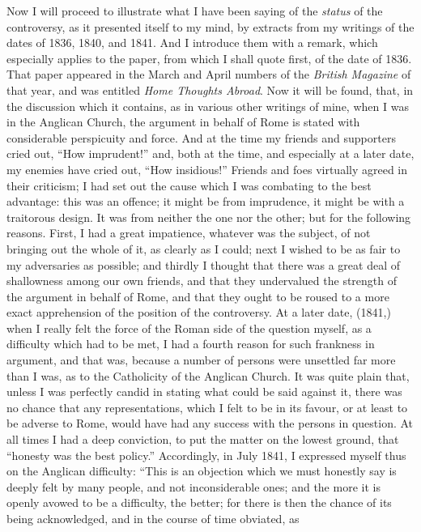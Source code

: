 Now I will proceed to illustrate what I have been saying of the \emph{status}
of the controversy, as it presented itself to my mind, by extracts from
my writings of the dates of 1836, 1840, and 1841. And I introduce them
with a remark, which especially applies to the paper, from which I shall
quote first, of the date of 1836. That paper appeared in the March and
April numbers of the \emph{British Magazine} of that year, and was entitled
\emph{Home Thoughts Abroad}. Now it will be found, that, in the
discussion which it contains, as in various other writings of mine, when
I was in the Anglican Church, the argument in behalf of Rome is stated
with considerable perspicuity and force. And at the time my friends and
supporters cried out, ``How imprudent!'' and, both at the time,
and especially at a later date, my enemies have cried out, ``How
insidious!'' Friends and foes virtually agreed in their criticism; I
had set out the cause which I was combating to the best advantage: this
was an offence; it might be from imprudence, it might be with a
traitorous design. It was from neither the one nor the other; but for
the following reasons. First, I had a great impatience, whatever was the
subject, of not bringing out the whole of it, as clearly as I could;
next I wished to be as fair to my adversaries as possible; and thirdly I
thought that there was a great deal of shallowness among our own
friends, and that they undervalued the strength of the argument in
behalf of Rome, and that they ought to be roused to a more exact
apprehension of the position of the controversy. At a later date, (1841,) when I really felt the force of the Roman side of the
question myself, as a difficulty which had to be met, I had a fourth
reason for such frankness in argument, and that was, because a number of
persons were unsettled far more than I was, as to the Catholicity of the
Anglican Church. It was quite plain that, unless I was perfectly candid
in stating what could be said against it, there was no chance that any
representations, which I felt to be in its favour, or at least to be
adverse to Rome, would have had any success with the persons in
question. At all times I had a deep conviction, to put the matter on
the lowest ground, that ``honesty was the best policy.'' Accordingly,
in July 1841, I expressed myself thus on the Anglican
difficulty: ``This is an objection which we must honestly say is
deeply felt by many people, and not inconsiderable ones; and the more it
is openly avowed to be a difficulty, the better; for there is then the
chance of its being acknowledged, and in the course of time obviated, as

